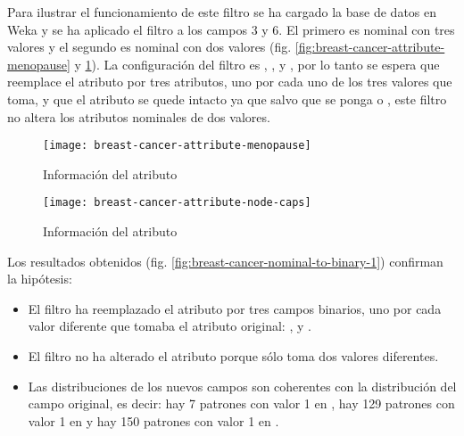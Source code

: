 Para ilustrar el funcionamiento de este filtro se ha cargado la base de datos  en Weka y se ha aplicado el filtro a los campos 3 y 6. El primero es nominal con tres valores y el segundo es nominal con dos valores (fig. \ref{fig:breast-cancer-attribute-menopause} y \ref{fig:breast-cancer-attribute-node-caps}). La configuración del filtro es , ,  y , por lo tanto se espera que reemplace el atributo  por tres atributos, uno por cada uno de los tres valores que toma, y que el atributo  se quede intacto ya que salvo que se ponga  o , este filtro no altera los atributos nominales de dos valores.

\begin{figure}[ht]
    \centering
    \begin{minipage}{0.50\textwidth}
        \centering
        \texttt{[image: breast-cancer-attribute-menopause]}
        \caption{Información del atributo }
        \label{fig:breast-cancer-attribute-menopause}
    \end{minipage}\hfill
    \begin{minipage}{0.50\textwidth}
        \centering
        \texttt{[image: breast-cancer-attribute-node-caps]}
        \caption{Información del atributo }
        \label{fig:breast-cancer-attribute-node-caps}
    \end{minipage}
\end{figure}

Los resultados obtenidos (fig. \ref{fig:breast-cancer-nominal-to-binary-1}) confirman la hipótesis:
\begin{itemize}
    \item El filtro ha reemplazado el atributo  por tres campos binarios, uno por cada valor diferente que tomaba el atributo original: ,  y .
    \item El filtro no ha alterado el atributo  porque sólo toma dos valores diferentes.
    \item Las distribuciones de los nuevos campos son coherentes con la distribución del campo original, es decir: hay 7 patrones con valor 1 en , hay 129 patrones con valor 1 en  y hay 150 patrones con valor 1 en .
\end{itemize}

